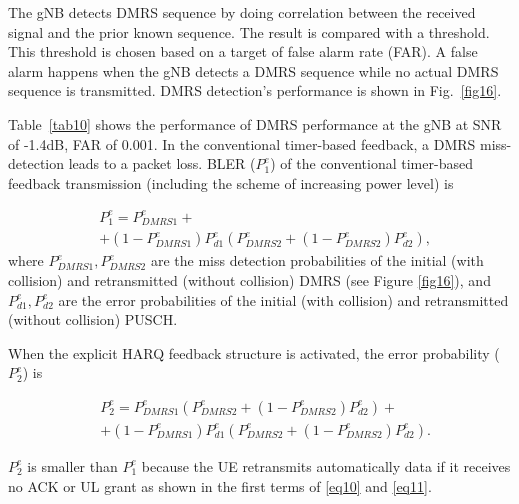 \documentclass{ieeeaccess}
\begin{document}
The gNB detects DMRS sequence by doing correlation between the received signal and the prior known sequence. The result is compared with a threshold. This threshold is chosen based on a target of false alarm rate (FAR). A false alarm happens when the gNB detects a DMRS sequence while no actual DMRS sequence is transmitted. DMRS detection's performance is shown in Fig.~\ref{fig16}.

Table~\ref{tab10} shows the performance of DMRS performance at the gNB at SNR of -1.4dB, FAR of 0.001. In the conventional timer-based feedback, a DMRS miss-detection leads to a packet loss. BLER ($ P^{e}_{1}$) of the conventional timer-based feedback transmission (including the scheme of increasing power level) is 

\begin{equation}
\begin{split}
 &P^{e}_{1} = P^{e}_{DMRS1} + \\
        &+ (1-P^{e}_{DMRS1})P^{e}_{d1}(P^{e}_{DMRS2} + (1-P^{e}_{DMRS2})P^{e}_{d2}),\label{eq10}   
\end{split}
\end{equation}
where $ P^{e}_{DMRS1}, P^{e}_{DMRS2}$ are the miss detection probabilities of the initial (with collision) and retransmitted (without collision) DMRS (see Figure \ref{fig16}), and $P^{e}_{d1}, P^{e}_{d2}$ are the error probabilities of the initial (with collision) and retransmitted (without collision) PUSCH.


When the explicit HARQ feedback structure is activated, the error probability ($ P^{e}_{2}$)  is 

\begin{equation}
\begin{split}
 &P^{e}_{2} = P^{e}_{DMRS1}(P^{e}_{DMRS2} + (1-P^{e}_{DMRS2})P^{e}_{d2}) + \\
        &+ (1-P^{e}_{DMRS1})P^{e}_{d1}(P^{e}_{DMRS2} + (1-P^{e}_{DMRS2})P^{e}_{d2}).\label{eq11}   
\end{split}
\end{equation}

$ P^{e}_{2}$ is smaller than $ P^{e}_{1}$ because the UE retransmits automatically data if it receives no ACK or UL grant as shown in the first terms of \eqref{eq10} and \eqref{eq11}. 
\end{document}
